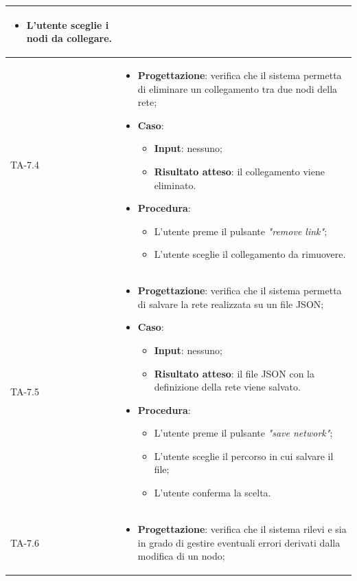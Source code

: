 \begin{longtable}{|C{2.5cm}|C{13cm}|}
\begin{itemize}
\begin{itemize}
		\item L'utente sceglie i nodi da collegare.
	\end{itemize} 
\end{itemize} \\
\hline
{TA-7.4} &
\begin{itemize}
	\item \textbf{Progettazione}: verifica che il sistema permetta di eliminare un collegamento tra due nodi della rete;
	\item \textbf{Caso}: 
	\begin{itemize}
		\item \textbf{Input}: nessuno;
		\item \textbf{Risultato atteso}: il collegamento viene eliminato.
	\end{itemize}
	\item \textbf{Procedura}:
	\begin{itemize}
		\item L'utente preme il pulsante \emph{"remove link"};
		\item L'utente sceglie il collegamento da rimuovere.
	\end{itemize} 
\end{itemize}\\
\hline
{TA-7.5} &
\begin{itemize}
	\item \textbf{Progettazione}: verifica che il sistema permetta di salvare la rete realizzata su un file JSON;
	\item \textbf{Caso}: 
	\begin{itemize}
		\item \textbf{Input}: nessuno;
		\item \textbf{Risultato atteso}: il file JSON con la definizione della rete viene salvato.
	\end{itemize}
	\item \textbf{Procedura}:
	\begin{itemize}
		\item L'utente preme il pulsante \emph{"save network"};
		\item L'utente sceglie il percorso in cui salvare il file;
		\item L'utente conferma la scelta.
	\end{itemize} 
\end{itemize} \\
\hline
{TA-7.6} &
\begin{itemize}
	\item \textbf{Progettazione}: verifica che il sistema rilevi e sia in grado di gestire eventuali errori derivati dalla modifica di un nodo;

\end{itemize}
\end{longtable}

